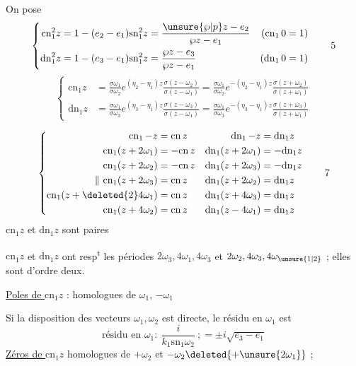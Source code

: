 On pose
\[
\left\{\begin{aligned}
\mathrm{cn}_1^2z&=1-(e_2-e_1)\mathrm{sn}_1^2z=\frac{\unsure{\wp|p}z-e_2}{\wp z-e_1}&(\mathrm{cn}_1\,0=1)\\
\mathrm{dn}_1^2z&=1-(e_3-e_1)\mathrm{sn}_1^2z=\frac{\wp z-e_3}{\wp z-e_1}&(\mathrm{dn}_1\,0=1)
\end{aligned}\right.\tag*{5}
\]
\[
\left\{\begin{aligned}
\mathrm{cn}_1z&=\frac{\sigma\omega_1}{\sigma\omega_2}e^{(\eta_2-\eta_1)z}\frac{\sigma(z-\omega_2)}{\sigma(z-\omega_1)}
=\frac{\sigma\omega_1}{\sigma\omega_2}e^{-(\eta_2-\eta_1)z}\frac{\sigma(z+\omega_2)}{\sigma(z+\omega_1)}\\
\mathrm{dn}_1z&=\frac{\sigma\omega_1}{\sigma\omega_3}e^{(\eta_3-\eta_1)z}\frac{\sigma(z-\omega_3)}{\sigma(z-\omega_1)}
=\frac{\sigma\omega_1}{\sigma\omega_3}e^{-(\eta_3-\eta_1)z}\frac{\sigma(z+\omega_3)}{\sigma(z+\omega_1)}
\end{aligned}\right.\tag*{6}
\]

\[
\left\{\begin{aligned}
\mathrm{cn}_1\,{-z}&=\mathrm{cn}\,z &\mathrm{dn}_1\,{-z}&=\mathrm{dn}_1z\\
\mathrm{cn}_1(z+2\omega_1)&=-\mathrm{cn}\,z &\mathrm{dn}_1(z+2\omega_1)&=-\mathrm{dn}_1z\\
\mathrm{cn}_1(z+2\omega_2)&=-\mathrm{cn}\,z &\mathrm{dn}_1(z+2\omega_{3})&=-\mathrm{dn}_1z\\
\Vert\ \mathrm{cn}_1(z+2\omega_3)&=\mathrm{cn}\,z &\mathrm{dn}_1(z+2\omega_2)&=\mathrm{dn}_1z\\
\mathrm{cn}_1(z+\deleted{2}4\omega_1)&=\mathrm{cn}\,z &\mathrm{dn}_1(z+4\omega_3)&=\mathrm{dn}_1z\\
\mathrm{cn}_1(z+4\omega_2)&=\mathrm{cn}\,z &\mathrm{dn}_1(z-4\omega_1)&=\mathrm{dn}_1z
\end{aligned}\right.\tag*{7}
\]
$\mathrm{cn}_1z$ et $\mathrm{dn}_1z$ sont paires

$\mathrm{cn}_1z$ et $\mathrm{dn}_1z$ ont resp\textsuperscript{t} les périodes $2\omega_3,4\omega_1,4\omega_3$ et $2\omega_2,4\omega_3,4\omega_{\unsure{1|2}}$ ; elles sont d'ordre deux.

\uline{Poles de $\mathrm{cn}_1z$} : homologues de $\omega_1$,   $-\omega_1$

Si la disposition des vecteurs $\omega_1,\omega_2$ est directe, le résidu en $\omega_1$ est
\[
\text{résidu en }\omega_1:\ \frac{i}{k_1\mathrm{sn}_1\omega_2}\ ;=\pm i\sqrt{e_3-e_1}
\]
\uline{Zéros de $\mathrm{cn}_1z$} homologues de $+\omega_2$ et $-\omega_2\deleted{+\unsure{2\omega_1}}$  ;

